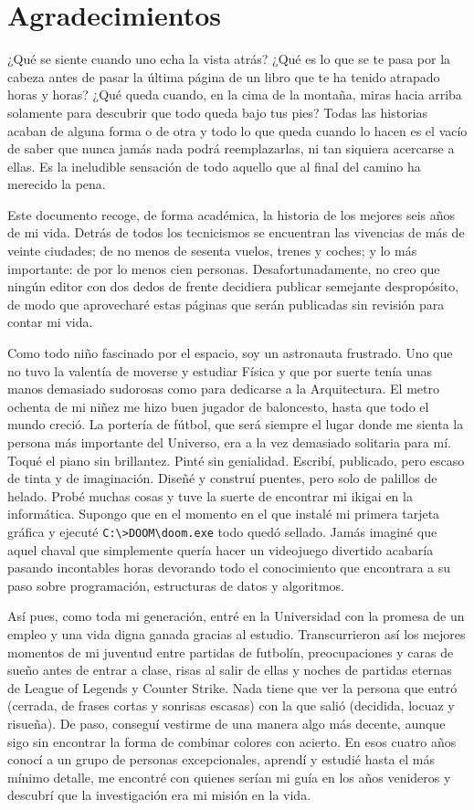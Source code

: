 \chapter{Agradecimientos}

¿Qué se siente cuando uno echa la vista atrás? ¿Qué es lo que se te pasa por la cabeza antes de pasar la última página de un libro que te ha tenido atrapado horas y horas? ¿Qué queda cuando, en la cima de la montaña, miras hacia arriba solamente para descubrir que todo queda bajo tus pies? Todas las historias acaban de alguna forma o de otra y todo lo que queda cuando lo hacen es el vacío de saber que nunca jamás nada podrá reemplazarlas, ni tan siquiera acercarse a ellas. Es la ineludible sensación de todo aquello que al final del camino ha merecido la pena.

Este documento recoge, de forma académica, la historia de los mejores seis años de mi vida. Detrás de todos los tecnicismos se encuentran las vivencias de más de veinte ciudades; de no menos de sesenta vuelos, trenes y coches; y lo más importante: de por lo menos cien personas. Desafortunadamente, no creo que ningún editor con dos dedos de frente decidiera publicar semejante despropósito, de modo que aprovecharé estas páginas que serán publicadas sin revisión para contar mi vida.

Como todo niño fascinado por el espacio, soy un astronauta frustrado. Uno que no tuvo la valentía de moverse y estudiar Física y que por suerte tenía unas manos demasiado sudorosas como para dedicarse a la Arquitectura. El metro ochenta de mi niñez me hizo buen jugador de baloncesto, hasta que todo el mundo creció. La portería de fútbol, que será siempre el lugar donde me sienta la persona más importante del Universo, era a la vez demasiado solitaria para mí. Toqué el piano sin brillantez. Pinté sin genialidad. Escribí, publicado, pero escaso de tinta y de imaginación. Diseñé y construí puentes, pero solo de palillos de helado. Probé muchas cosas y tuve la suerte de encontrar mi ikigai en la informática. Supongo que en el momento en el que instalé mi primera tarjeta gráfica y ejecuté \verb|C:\>DOOM\doom.exe| todo quedó sellado. Jamás imaginé que aquel chaval que simplemente quería hacer un videojuego divertido acabaría pasando incontables horas devorando todo el conocimiento que encontrara a su paso sobre programación, estructuras de datos y algoritmos.

Así pues, como toda mi generación, entré en la Universidad con la promesa de un empleo y una vida digna ganada gracias al estudio. Transcurrieron así los mejores momentos de mi juventud entre partidas de futbolín, preocupaciones y caras de sueño antes de entrar a clase, risas al salir de ellas y noches de partidas eternas de League of Legends y Counter Strike. Nada tiene que ver la persona que entró (cerrada, de frases cortas y sonrisas escasas) con la que salió (decidida, locuaz y risueña). De paso, conseguí vestirme de una manera algo más decente, aunque sigo sin encontrar la forma de combinar colores con acierto. En esos cuatro años conocí a un grupo de personas excepcionales, aprendí y estudié hasta el más mínimo detalle, me encontré con quienes serían mi guía en los años venideros y descubrí que la investigación era mi misión en la vida.

